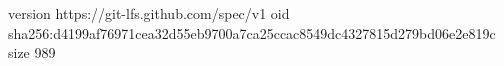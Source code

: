 version https://git-lfs.github.com/spec/v1
oid sha256:d4199af76971cea32d55eb9700a7ca25ccac8549dc4327815d279bd06e2e819c
size 989
